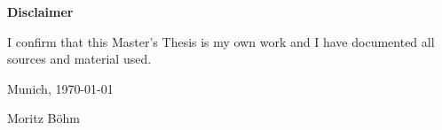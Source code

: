 \cleardoublepage{}

\thispagestyle{empty}

\vspace*{20mm}
\noindent

\makeatletter

\begin{center}
    {\textbf{Disclaimer}}
\end{center}

\begin{flushleft}
    {I confirm that this Master's Thesis is my own work and I have documented all sources and material used.}

    \makeatother

    \vspace{15mm}
    \noindent

    Munich, \today{}

    Moritz Böhm
\end{flushleft}

\cleardoublepage{}
